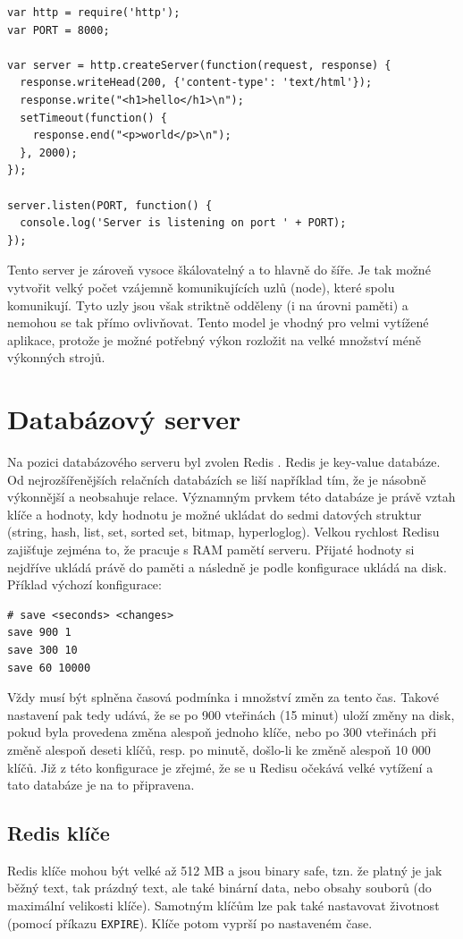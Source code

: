 \begin{verbatim}
var http = require('http');
var PORT = 8000;

var server = http.createServer(function(request, response) {
  response.writeHead(200, {'content-type': 'text/html'});
  response.write("<h1>hello</h1>\n");
  setTimeout(function() {
    response.end("<p>world</p>\n");
  }, 2000);
});

server.listen(PORT, function() {
  console.log('Server is listening on port ' + PORT);
});
\end{verbatim}

Tento server je zároveň vysoce škálovatelný a to hlavně do šíře. Je tak možné vytvořit velký počet vzájemně komunikujících uzlů (node), které spolu komunikují. Tyto uzly jsou však striktně odděleny (i na úrovni paměti) a nemohou se tak přímo ovlivňovat. Tento model je vhodný pro velmi vytížené aplikace, protože je možné potřebný výkon rozložit na velké množství méně výkonných strojů.

\section{Databázový server}
Na pozici databázového serveru byl zvolen Redis \cite{redis}. Redis je key-value databáze. Od nejrozšířenějších relačních databázích se liší například tím, že je násobně výkonnější a neobsahuje relace. Významným prvkem této databáze je právě vztah klíče a hodnoty, kdy hodnotu je možné ukládat do sedmi datových struktur (string, hash, list, set, sorted set, bitmap, hyperloglog). Velkou rychlost Redisu zajišťuje zejména to, že pracuje s RAM pamětí serveru. Přijaté hodnoty si nejdříve ukládá právě do paměti a následně je podle konfigurace ukládá na disk. Příklad výchozí konfigurace:

\begin{verbatim}
# save <seconds> <changes>
save 900 1
save 300 10
save 60 10000
\end{verbatim}

Vždy musí být splněna časová podmínka i množství změn za tento čas. Takové nastavení pak tedy udává, že se po 900 vteřinách (15 minut) uloží změny na disk, pokud byla provedena změna alespoň jednoho klíče, nebo po 300 vteřinách při změně alespoň deseti klíčů, resp. po minutě, došlo-li ke změně alespoň 10 000 klíčů. Již z této konfigurace je zřejmé, že se u Redisu očekává velké vytížení a tato databáze je na to připravena.

\subsection{Redis klíče}
Redis klíče mohou být velké až 512 MB a jsou binary safe, tzn. že platný je jak běžný text, tak prázdný text, ale také binární data, nebo obsahy souborů (do maximální velikosti klíče). Samotným klíčům lze pak také nastavovat životnost (pomocí příkazu \texttt{EXPIRE}). Klíče potom vyprší po nastaveném čase.

